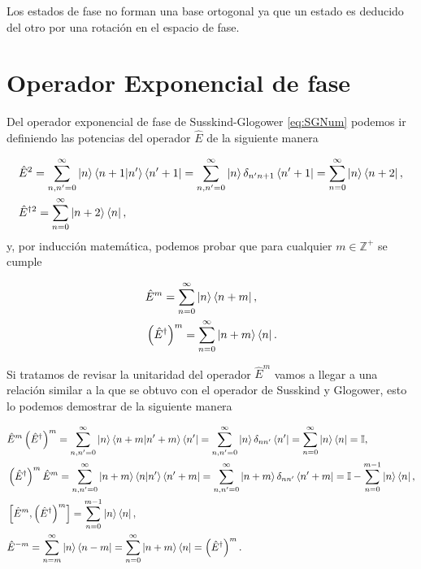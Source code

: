         Los estados de fase no forman una base ortogonal ya que un estado es deducido del otro por una rotación en el espacio de fase.

\section{Operador Exponencial de fase}

        Del operador exponencial de fase de Susskind-Glogower \ref{eq:SGNum} podemos ir definiendo las potencias del operador $\hat{E}$ de la siguiente manera

        \begin{align}
            & \hat{E}^2 = \sum_{n,n'=0}^\infty \ket{n}\braket{n+1|n'}\bra{n'+1} = \sum_{n,n'=0}^\infty\ket{n}\delta_{n'n+1}\bra{n'+1} = \sum_{n=0}^\infty \ket{n}\bra{n+2},\\
            & \hat{E}^{\dagger 2} = \sum_{n=0}^\infty \ket{n+2}\bra{n},
        \end{align}
        y, por inducción matemática, podemos probar que para cualquier $m \in \mathbb{Z}^+$ se cumple

        \begin{align}
            & \hat{E}^m = \sum_{n=0}^\infty \ket{n}\bra{n+m},\\
            & \left( \hat{E}^\dagger \right)^m = \sum_{n=0}^\infty \ket{n+m}\bra{n}.
        \end{align}

        Si tratamos de revisar la unitaridad del operador $\hat{E}^m$ vamos a llegar a una relación similar a la que se obtuvo con el operador de Susskind y Glogower, esto lo podemos demostrar de la siguiente manera

        \begin{align}\label{eq:VariosE}
            & \hat{E}^m \left( \hat{E}^\dagger \right)^m = \sum_{n,n'=0}^\infty \ket{n}\braket{n+m|n'+m}\bra{n'} = \sum_{n,n'=0}^\infty \ket{n}\delta_{nn'}\bra{n'} = \sum_{n=0}^\infty \ket{n}\bra{n}=\mathbb{I},\\
            & \left( \hat{E}^\dagger \right)^m \hat{E}^m = \sum_{n,n'=0}^\infty \ket{n+m}\braket{n|n'}\bra{n'+m} = \sum_{n,n'=0}^\infty\ket{n+m}\delta_{nn'}\bra{n'+m} = \mathbb{I}- \sum_{n=0}^{m-1}\ket{n}\bra{n},\\
            & \left[ \hat{E}^m, \left( \hat{E}^\dagger \right)^m \right] = \sum_{n=0}^{m-1}\ket{n}\bra{n},\\
            & \hat{E}^{-m} = \sum_{n=m}^\infty \ket{n}\bra{n-m} = \sum_{n=0}^\infty \ket{n+m}\bra{n} = \left( \hat{E}^\dagger \right)^m.
        \end{align}

